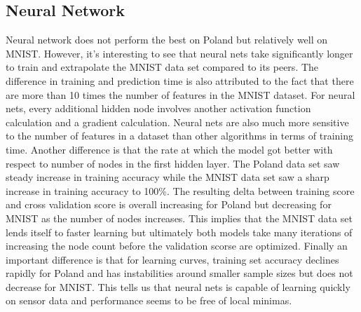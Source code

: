 \documentclass{article}
\begin{document}
\subsection{Neural Network}
Neural network does not perform the best on Poland but relatively well on MNIST. However, it's interesting to see that neural nets take significantly longer to train and extrapolate the MNIST data set compared to its peers. The difference in training and prediction time is also attributed to the fact that there are more than 10 times the number of features in the MNIST dataset. For neural nets, every additional hidden node involves another activation function calculation and a gradient calculation. Neural nets are also much more sensitive to the number of features in a dataset than other algorithms in terms of training time. Another difference is that the rate at which the model got better with respect to number of nodes in the first hidden layer. The Poland data set saw steady increase in training accuracy while the MNIST data set saw a sharp increase in training accuracy to 100\%. The resulting delta between training score and cross validation score is overall increasing for Poland but decreasing for MNIST as the number of nodes increases. This implies that the MNIST data set lends itself to faster learning but ultimately both models take many iterations of increasing the node count before the validation scorse are optimized. Finally an important difference is that for learning curves, training set accuracy declines rapidly for Poland and has instabilities around smaller sample sizes but does not decrease for MNIST. This tells us that neural nets is capable of learning quickly on sensor data and performance seems to be free of local minimas. 
\end{document}
